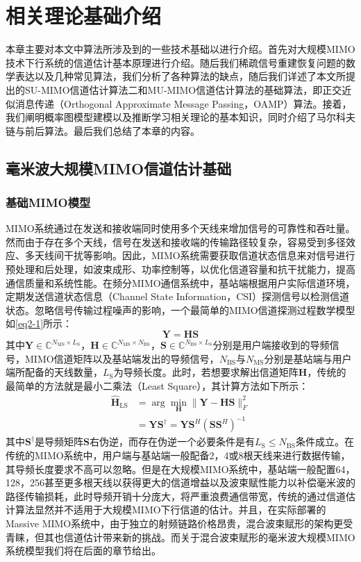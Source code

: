 \documentclass{xdupgthesis}
\begin{document}
\chapter{相关理论基础介绍}
本章主要对本文中算法所涉及到的一些技术基础以进行介绍。首先对大规模MIMO技术下行系统的信道估计基本原理进行介绍。随后我们稀疏信号重建恢复问题的数学表达以及几种常见算法，我们分析了各种算法的缺点，随后我们详述了本文所提出的SU-MIMO信道估计算法二和MU-MIMO信道估计算法的基础算法，即正交近似消息传递（Orthogonal Approximate Message Passing，OAMP）算法。接着，我们阐明概率图模型建模以及推断学习相关理论的基本知识，同时介绍了马尔科夫链与前后算法。最后我们总结了本章的内容。
\section{毫米波大规模MIMO信道估计基础}
\subsection{基础MIMO模型}
MIMO系统通过在发送和接收端同时使用多个天线来增加信号的可靠性和吞吐量。然而由于存在多个天线，信号在发送和接收端的传输路径较复杂，容易受到多径效应、多天线间干扰等影响。因此，MIMO系统需要获取信道状态信息来对信号进行预处理和后处理，如波束成形、功率控制等，以优化信道容量和抗干扰能力，提高通信质量和系统性能。在频分MIMO通信系统中，基站端根据用户实际信道环境，定期发送信道状态信息（Channel State Information，CSI）探测信号以检测信道状态。忽略信号传输过程噪声的影响，一个最简单的MIMO信道探测过程数学模型如\eqref{eq2-1}所示：
\begin{equation}
    \label{eq2-1}
    \mathbf{Y} = \mathbf{H}\mathbf{S}
\end{equation}
其中$\mathbf{Y} \in \mathbb{C}^{N_\mathrm{MS}\times L_\mathrm{S}}$，$\mathbf{H} \in \mathbb{C}^{N_\mathrm{MS}\times N_\mathrm{BS}}$，$\mathbf{S} \in \mathbb{C}^{N_\mathrm{BS}\times L_\mathrm{S}}$分别是用户端接收到的导频信号，MIMO信道矩阵以及基站端发出的导频信号，$N_\mathrm{BS}$与$N_\mathrm{MS}$分别是基站端与用户端所配备的天线数量，$L_\mathrm{S}$为导频长度。此时，若想要求解出信道矩阵$\mathbf{H}$，传统的最简单的方法就是最小二乘法（Least Square），其计算方法如下所示：
\begin{equation}
    \begin{aligned}
        \hat{\mathbf{H}}_{\mathrm{LS}} & =\arg \min _{\mathbf{H}}\|\mathbf{Y}-\mathbf{H S}\|_{F}^{2} \\
        & =\mathbf{Y} \mathbf{S}^{\dagger}=\mathbf{Y} \mathbf{S}^{H}\left(\mathbf{S S}^{H}\right)^{-1}
    \end{aligned}
\end{equation}
其中$\mathbf{S}^{\dagger}$是导频矩阵$\mathbf{S}$右伪逆，而存在伪逆一个必要条件是有$L_\mathrm{S} \leq N_\mathrm{BS}$条件成立。在传统的MIMO系统中，用户端与基站端一般配备2，4或8根天线来进行数据传输，其导频长度要求不高可以忽略。但是在大规模MIMO系统中，基站端一般配置64，128，256甚至更多根天线以获得更大的信道增益以及波束赋性能力以补偿毫米波的路径传输损耗，此时导频开销十分庞大，将严重浪费通信带宽，传统的通过信道估计算法显然并不适用于大规模MIMO下行信道的估计。并且，在实际部署的Massive MIMO系统中，由于独立的射频链路价格昂贵，混合波束赋形的架构更受青睐，但其也信道估计带来新的挑战。而关于混合波束赋形的毫米波大规模MIMO系统模型我们将在后面的章节给出。
\end{document}
